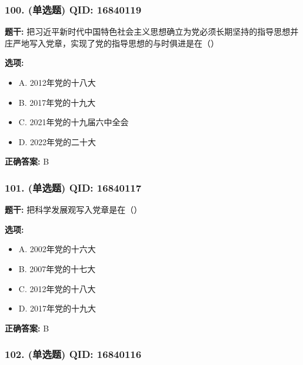 \documentclass[12pt,UTF8]{ctexart}
\begin{document}
\subsubsection*{100. (单选题) \small QID: 16840119}

\textbf{题干:}
把习近平新时代中国特色社会主义思想确立为党必须长期坚持的指导思想并庄严地写入党章，实现了党的指导思想的与时俱进是在（）

\textbf{选项:}
\begin{itemize}[leftmargin=*]

  \item A. 2012年党的十八大

  \item B. 2017年党的十九大

  \item C. 2021年党的十九届六中全会

  \item D. 2022年党的二十大

\end{itemize}

\textbf{正确答案:}
B

\vspace{0.3em}\hrulefill\vspace{0.7em}

\subsubsection*{101. (单选题) \small QID: 16840117}

\textbf{题干:}
把科学发展观写入党章是在（）

\textbf{选项:}
\begin{itemize}[leftmargin=*]

  \item A. 2002年党的十六大

  \item B. 2007年党的十七大

  \item C. 2012年党的十八大

  \item D. 2017年党的十九大

\end{itemize}

\textbf{正确答案:}
B

\vspace{0.3em}\hrulefill\vspace{0.7em}

\subsubsection*{102. (单选题) \small QID: 16840116}
\end{document}
